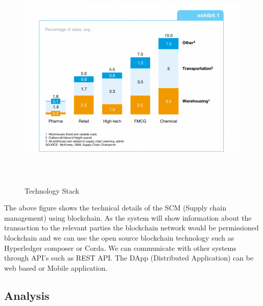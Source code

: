 \documentclass[12pt]{article}
\begin{document}
\begin{figure}[H]
	\begin{Center}
		\includegraphics[width=6.01in,height=4.25in]{.//media/2.png}
		\caption{Technology Stack}
	\end{Center}
\end{figure}




{\fontsize{14pt}{16.8pt}\selectfont The above figure shows the technical details of the SCM (Supply chain management) using blockchain. As the system will show information about the transaction to the relevant parties the blockchain network would be permissioned blockchain and we can use the open source blockchain technology such as Hyperledger composer or Corda. We can communicate with other systems through API’s such as REST API. The DApp (Distributed Application) can be web based or Mobile application.\par}\par




\newpage

\vspace{\baselineskip}\begin{Center}
\section*{Analysis}
\end{Center}
\end{document}
